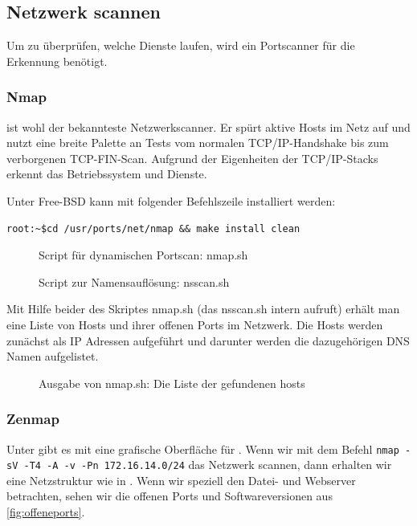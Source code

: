 \subsection{Netzwerk scannen}

Um zu überprüfen, welche Dienste laufen, wird ein Portscanner für die Erkennung
benötigt.

\subsubsection{Nmap}

\Nmap{} ist wohl der bekannteste Netzwerkscanner. Er spürt aktive Hosts im Netz auf
und nutzt eine breite Palette an Tests vom normalen TCP/IP-Handshake bis zum
verborgenen TCP-FIN-Scan. Aufgrund der Eigenheiten der TCP/IP-Stacks erkennt
\Nmap{} das Betriebssystem und Dienste.

Unter Free-BSD kann \Nmap{} mit folgender Befehlszeile installiert werden:

\begin{verbatim}
root:~$cd /usr/ports/net/nmap && make install clean
\end{verbatim}

\begin{figure}

\caption{Script für dynamischen Portscan: nmap.sh}
\end{figure}

\begin{figure}

\caption{Script zur Namensauflösung: nsscan.sh}
\end{figure}

Mit Hilfe beider des Skriptes nmap.sh (das nsscan.sh intern aufruft) erhält man
eine Liste von Hosts und ihrer offenen Ports im Netzwerk. Die Hosts werden
zunächst als IP Adressen aufgeführt und darunter werden die dazugehörigen DNS
Namen aufgelistet.
\begin{figure}

\caption{Ausgabe von nmap.sh: Die Liste der gefundenen hosts}
\end{figure}

\subsubsection{Zenmap}

Unter \Windows{} gibt es mit \Zenmap{} eine grafische Oberfläche für \Nmap{}. Wenn wir mit dem Befehl 
\lstinline{nmap -sV -T4 -A -v -Pn 172.16.14.0/24} das Netzwerk scannen, dann erhalten wir eine Netzstruktur wie in
 . Wenn wir speziell den Datei- und Webserver betrachten, sehen wir die offenen Ports und Softwareversionen aus \cref{fig:offeneports}.

